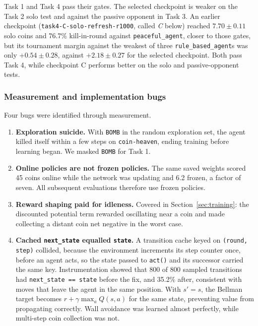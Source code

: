 \documentclass[11pt]{article}
\newcommand{\code}[1]{\texttt{#1}}
\begin{document}
Task 1 and Task 4 pass their gates. The selected checkpoint is weaker on the Task 2 solo
test and against the passive opponent in Task 3. An earlier checkpoint
(\code{task4-C-solo-refresh-r1000}, called \emph{C} below) reached $7.70 \pm 0.11$ solo
coins and 76.7\% kill-in-round against \code{peaceful\_agent}, closer to those gates, but
its tournament margin against the weakest of three
\code{rule\_based\_agent}s was only $+0.54 \pm 0.28$, against $+2.18 \pm 0.27$ for the
selected checkpoint. Both pass Task 4, while checkpoint C performs better on the solo and
passive-opponent tests.

\subsubsection{Measurement and implementation bugs}

Four bugs were identified through measurement.

\begin{enumerate}
\item \textbf{Exploration suicide.} With \code{BOMB} in the random exploration set, the
      agent killed itself within a few steps on \code{coin-heaven}, ending training before
      learning began. We masked \code{BOMB} for Task 1.
\item \textbf{Online policies are not frozen policies.} The same saved weights scored 45
      coins online while the network was updating and 6.2 frozen, a factor of seven. All
      subsequent evaluations therefore use frozen policies.
\item \textbf{Reward shaping paid for idleness.} Covered in Section~\ref{sec:training}: the
      discounted potential term rewarded oscillating near a coin and made collecting a
      distant coin net negative in the worst case.
\item \textbf{Cached \code{next\_state} equalled \code{state}.} A transition cache keyed on
      \code{(round, step)} collided, because the environment increments its step counter
      once, before an agent acts, so the state passed to \code{act()} and its successor
      carried the same key. Instrumentation showed that 800 of 800 sampled transitions had
      \code{next\_state == state} before the fix, and 35.2\% after, consistent with moves
      that leave the agent in the same position. With $s'=s$, the Bellman target becomes
      $r + \gamma \max_a Q(s,a)$ for the same state, preventing value from propagating
      correctly. Wall avoidance was learned almost perfectly, while multi-step coin
      collection was not.
\end{enumerate}
\end{document}

